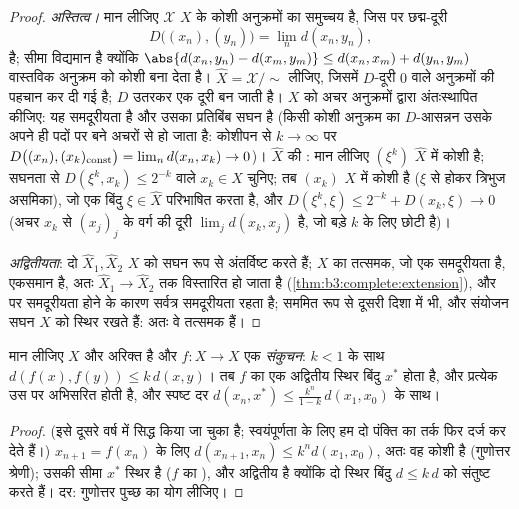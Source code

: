 \begin{proof}
\emph{अस्तित्व।} मान लीजिए $\mathcal X$ $X$ के कोशी अनुक्रमों का
समुच्चय है, जिस पर छद्म-दूरी
\[
D\bigl((x_n), (y_n)\bigr) = \lim_n d(x_n, y_n),
\]
है; सीमा विद्यमान है क्योंकि $\abs{d(x_n, y_n) - d(x_m, y_m)}
\leq d(x_n, x_m) + d(y_n, y_m)$ वास्तविक अनुक्रम को कोशी बना
देता है। $\hat X = \mathcal X/{\sim}$ लीजिए, जिसमें $D$-दूरी $0$ वाले अनुक्रमों की
पहचान कर दी गई है; $D$ उतरकर एक दूरी बन जाती है। $X$ को अचर
अनुक्रमों द्वारा अंतःस्थापित कीजिए: यह समदूरीयता है और उसका
प्रतिबिंब सघन है (किसी कोशी अनुक्रम का $D$-आसन्नन उसके अपने ही
पदों पर बने अचरों से हो जाता है: कोशीपन से $k \to \infty$ पर $D\bigl((x_n), (x_k)_{\rm
const}\bigr) = \lim_n d(x_n, x_k) \to 0$)। $\hat X$
की : मान लीजिए $(\xi^k)$ $\hat X$ में कोशी है; सघनता से $D(\xi^k, x_k)
\leq 2^{-k}$ वाले
$x_k \in X$ चुनिए; तब $(x_k)$ $X$ में कोशी है ($\xi$ से होकर त्रिभुज
असमिका), जो एक बिंदु $\xi \in \hat
X$ परिभाषित करता है, और $D(\xi^k, \xi) \leq 2^{-k} + D(x_k, \xi) \to 0$ (अचर $x_k$ से
$(x_j)_j$ के वर्ग की दूरी $\lim_j d(x_k, x_j)$ है, जो बड़े $k$ के लिए छोटी है)।

\emph{अद्वितीयता}: दो  $\hat X_1, \hat X_2$ $X$ को सघन रूप से अंतर्विष्ट
करते हैं; $X$ का तत्समक, जो एक समदूरीयता है, एकसमान  है,
अतः $\hat X_1 \to \hat X_2$ तक विस्तारित हो जाता है (\cref{thm:b3:complete:extension}), और  पर
समदूरीयता होने के कारण सर्वत्र समदूरीयता रहता है; सममित रूप से
दूसरी दिशा में भी, और संयोजन सघन $X$ को स्थिर रखते हैं: अतः वे
तत्समक हैं।
\end{proof}

\begin{theorem}[बानाख स्थिर बिंदु]\label{thm:b3:complete:banach}
मान लीजिए $X$  और अरिक्त है और $f \colon X \to X$ एक \emph{संकुचन}:
$k < 1$ के साथ $d(f(x), f(y)) \leq k\,d(x,y)$। तब $f$ का एक अद्वितीय स्थिर बिंदु $x^*$ होता
है, और प्रत्येक  उस पर अभिसरित होती है, और स्पष्ट दर
$d(x_n, x^*) \leq
\frac{k^n}{1-k}\,d(x_1, x_0)$ के साथ।
\end{theorem}

\begin{proof}
(इसे दूसरे वर्ष में सिद्ध किया जा चुका है; स्वयंपूर्णता के लिए हम
दो पंक्ति का तर्क फिर दर्ज कर देते हैं।)  $x_{n+1} = f(x_n)$ के लिए
$d(x_{n+1},
x_n) \leq k^nd(x_1, x_0)$, अतः वह कोशी है (गुणोत्तर श्रेणी); उसकी सीमा $x^*$ स्थिर है
($f$ का ), और अद्वितीय है क्योंकि दो स्थिर बिंदु $d \leq k\,d$
को संतुष्ट करते हैं। दर: गुणोत्तर पुच्छ का योग लीजिए।
\end{proof}

